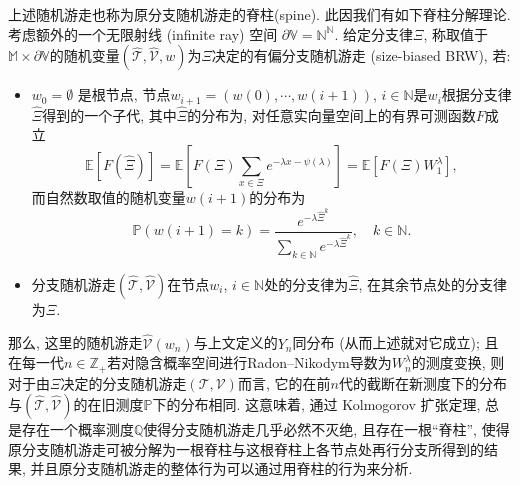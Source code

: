 {    }{
        上述随机游走也称为原分支随机游走的{\kaishu 脊柱}(spine). 此因我们有如下脊柱分解理论. 考虑额外的一个{\kaishu 无限射线} (infinite ray) 空间 $\partial\mathbb V=\mathbb N^{\mathbb N}$. 给定分支律$\Xi$, 称取值于$\mathbb M\times\partial\mathbb V$的随机变量$(\hat{\mathcal T},\hat{\mathcal V},w)$为$\Xi$决定的{\kaishu 有偏分支随机游走} (size-biased BRW), 若:
        \begin{itemize}
            \item $w_0=\emptyset$ 是根节点, 节点$w_{i+1}=(w(0),\cdots,w(i+1))$, $i\in\mathbb N$是$w_i$根据分支律$\hat\Xi$得到的一个子代, 其中$\hat\Xi$的分布为, 对任意实向量空间上的有界可测函数$F$成立
            \begin{equation*}
                \mathbb E[F(\hat\Xi)]
                =
                \mathbb E\left[
                    F(\Xi)
                    \sum_{x\in\Xi}
                    e^{-\lambda x-\psi(\lambda)}
                \right]
                =
                \mathbb E\left[
                    F(\Xi)
                    W_1^\lambda
                \right],
            \end{equation*}
            而自然数取值的随机变量$w(i+1)$的分布为
            \begin{equation*}
                \mathbb P(w(i+1)=k)
                =
                \frac{
                    e^{-\lambda\hat\Xi^k}
                }{
                    \sum_{k\in\mathbb N}
                    e^{-\lambda\hat\Xi^k}
                },
                \quad k\in\mathbb N.
            \end{equation*}
            \item 分支随机游走$(\hat{\mathcal T},\hat{\mathcal V})$在节点$w_i$, $i\in\mathbb N$处的分支律为$\hat\Xi$, 在其余节点处的分支律为$\Xi$.
        \end{itemize}
        那么, 这里的随机游走$\hat{\mathcal V}(w_n)$与上文定义的$Y_n$同分布 (从而上述就对它成立); 且在每一代$n\in\mathbb Z_+$若对隐含概率空间进行Radon--Nikodym导数为$W_n^\lambda$的测度变换, 则对于由$\Xi$决定的分支随机游走$(\mathcal T,\mathcal V)$而言, 它的在前$n$代的截断在新测度下的分布与$(\hat{\mathcal T},\hat{\mathcal V})$的在旧测度$\mathbb P$下的分布相同. 这意味着, 通过 Kolmogorov 扩张定理, 总是存在一个概率测度$\mathbb Q$使得分支随机游走几乎必然不灭绝, 且存在一根``脊柱'', 使得原分支随机游走可被分解为一根脊柱与这根脊柱上各节点处再行分支所得到的结果, 并且原分支随机游走的整体行为可以通过用脊柱的行为来分析.
    }

\raggedbottom
